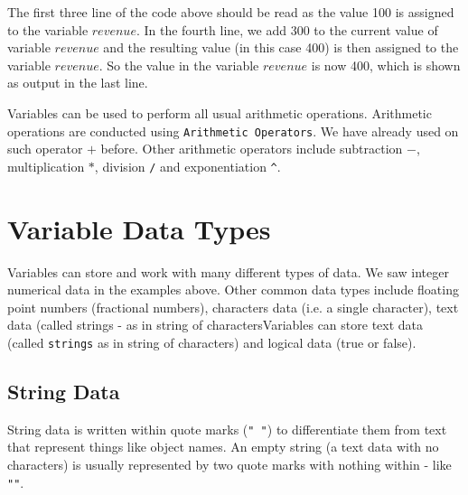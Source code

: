 \documentclass[11pt, letterpaper, twoside]{memoir}\usepackage{knitr}
\begin{document}
The first three line of the code above should be read as the value 100 is assigned to the variable $revenue$. In the fourth line, we add 300 to the current value of variable $revenue$ and the resulting value (in this case 400) is then assigned to the variable $revenue$. So the value in the variable $revenue$ is now 400, which is shown as output in the last line.

Variables can be used to perform all usual arithmetic operations. Arithmetic operations are conducted using \verb|Arithmetic Operators|. We have already used on such operator $+$ before. Other arithmetic operators include subtraction $-$, multiplication $*$, division \verb|/| and exponentiation \verb|^|.

\section{Variable Data Types}

Variables can store and work with many different types of data. We saw integer numerical data in the examples above. Other common data types include floating point numbers (fractional numbers), characters data (i.e. a single character), text data (called strings - as in string of charactersVariables can store text data (called \texttt{strings} as in string of characters) and logical data (true or false).

\subsection{String Data}

String data is written within quote marks (\texttt{" "}) to differentiate them from text that represent things like object names. An empty string (a text data with no characters) is usually represented by two quote marks with nothing within - like \texttt{""}.

\begin{knitrout}
\color{fgcolor}\begin{kframe}
\begin{alltt}
 \hlkwb{<-}   
 \hlkwb{<-}   
\end{alltt}
\end{kframe}
\end{knitrout}
\end{document}
